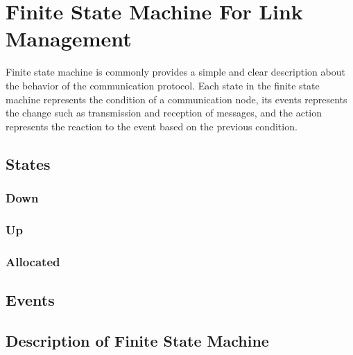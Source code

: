 \section{Finite State Machine For Link Management}

Finite state machine is commonly provides a simple and clear description about the behavior of the communication protocol\cite{BOCHMANN1978361}.
Each state in the finite state machine represents the condition of a communication node, its events represents the change such as transmission and reception of messages, and the action represents the reaction to the event based on the previous condition.

\subsection{States}

\subsubsection{Down}
\subsubsection{Up}
\subsubsection{Allocated}

\subsection{Events}
\subsection{Description of Finite State Machine}


